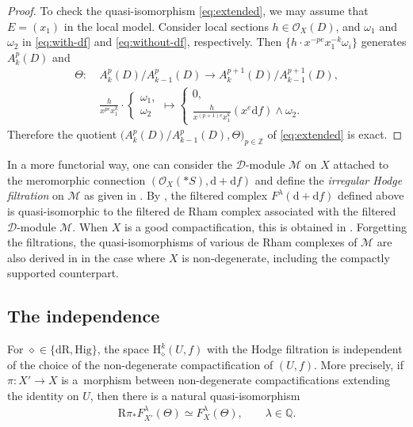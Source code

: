 \documentclass[pdftex]{sigma}
\newcommand{\QQ}{\mathbb{Q}}
\newcommand{\ZZ}{\mathbb{Z}}
\newcommand{\sD}{\mathscr{D}}
\newcommand{\sM}{\mathscr{M}}
\newcommand{\sO}{\mathscr{O}}
\newcommand{\de}{\mathrm{d}}
\newcommand{\dR}{\mathrm{dR}}
\newcommand{\Hig}{\mathrm{Hig}}
\newcommand{\coH}{\mathrm{H}}
\newcommand{\dRH}{\diamond}
\newcommand{\ddRH}{\Theta}
\newcommand{\cpt}{compactification}
\newcommand{\RD}{\mathrm{R}}
\begin{document}
\begin{proof}
To check the quasi-isomorphism \eqref{eq:extended}, we may assume that $E = (x_1)$ in the local model. Consider local sections $h\in\sO_X(D)$, and $\omega_1$ and $\omega_2$ in \eqref{eq:with-df} and \eqref{eq:without-df},
respectively. Then $\big\{h\cdot x^{-pe}x_1^{-k}\omega_i\big\}$ generates $A_k^p(D)$ and
\begin{align*}
\ddRH\colon \ & A_k^p(D)/A_{k-1}^p(D) \to A_k^{p+1}(D)/A_{k-1}^{p+1}(D), \\
& \frac{h}{x^{pe}x_1^k}\cdot \begin{cases}
\omega_1, \\ \omega_2
\end{cases}
 \mapsto \begin{cases}
0, \\
\frac{h}{x^{(p+1)e} x_1^k} (x^e\de f)\wedge\omega_2.
\end{cases}
\end{align*}
Therefore the quotient $\big(A_k^p(D)/A_{k-1}^p(D),\ddRH\big)_{p\in\ZZ}$ of \eqref{eq:extended} is exact.
\end{proof}

\begin{remark*} In a more functorial way, one can consider the $\sD$-module $\sM$ on $X$ attached to the meromorphic connection $(\sO_X(*S),\de +\de f)$ and define the \textit{irregular Hodge filtration} on $\sM$ as given in \cite[Definition~5.1]{SY}. By \cite[Lemma~9.17]{SY}, the filtered complex $F^\lambda(\de +\de f)$ defined above is quasi-isomorphic to the filtered de Rham complex associated with the filtered $\sD$-module $\sM$. When $X$ is a good {\cpt}, this is obtained in \cite[Proposition~1.7.4]{ESY}. Forgetting the filtrations, the quasi-isomorphisms of various de Rham complexes of $\sM$ are also derived in \cite[Lemmas 2.13 and 2.15]{M_GKZ} in the case where $X$ is non-degenerate, including the compactly supported counterpart.
\end{remark*}

\subsection{The independence}
\begin{proposition*}
For $\dRH \in \{\dR,\Hig\}$, the space $\coH_\dRH^k(U,f)$ with the Hodge filtration is independent of the choice of the non-degenerate {\cpt} of $(U,f)$. More precisely, if $\pi\colon X' \to X$ is a~morphism between non-degenerate {\cpt}s extending the identity on $U$, then there is a natural quasi-isomorphism
\begin{gather}\label{eq:RpiF}
\RD\pi_* F^\lambda_{X'}(\ddRH) \simeq F^\lambda_X(\ddRH), \qquad \lambda\in\QQ.
\end{gather}
\end{proposition*}
\end{document}
